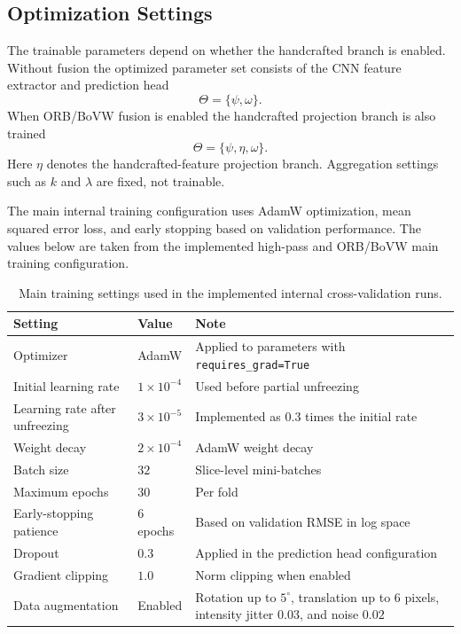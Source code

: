\subsection{Optimization Settings}
\label{sec:optimization_settings}
The trainable parameters depend on whether the handcrafted branch is enabled. Without fusion the optimized parameter set consists of the CNN feature extractor and prediction head
\[
\Theta=\{\psi,\omega\}.
\]
When ORB/BoVW fusion is enabled the handcrafted projection branch is also trained
\[
\Theta=\{\psi,\eta,\omega\}.
\]
Here \(\eta\) denotes the handcrafted-feature projection branch. Aggregation settings such as \(k\) and \(\lambda\) are fixed, not trainable.

The main internal training configuration uses AdamW optimization, mean squared error loss, and early stopping based on validation performance. The values below are taken from the implemented high-pass and ORB/BoVW main training configuration.

\begin{table}[htbp]
\centering
\caption{Main training settings used in the implemented internal cross-validation runs.}
\label{tab:method_training_settings}
\begin{tabular}{p{}p{}p{}}
\toprule
Setting & Value & Note \\
\midrule
Optimizer & AdamW & Applied to parameters with \texttt{requires\_grad=True} \\
Initial learning rate & \(1\times10^{-4}\) & Used before partial unfreezing \\
Learning rate after unfreezing & \(3\times10^{-5}\) & Implemented as \(0.3\) times the initial rate \\
Weight decay & \(2\times10^{-4}\) & AdamW weight decay \\
Batch size & \(32\) & Slice-level mini-batches \\
Maximum epochs & \(30\) & Per fold \\
Early-stopping patience & \(6\) epochs & Based on validation RMSE in log space \\
Dropout & \(0.3\) & Applied in the prediction head configuration \\
Gradient clipping & \(1.0\) & Norm clipping when enabled \\
Data augmentation & Enabled & Rotation up to \(5^\circ\), translation up to \(6\) pixels, intensity jitter \(0.03\), and noise \(0.02\) \\
\bottomrule
\end{tabular}
\end{table}


